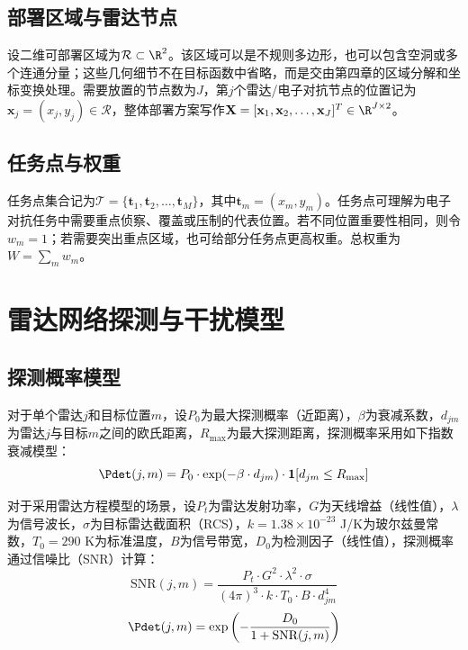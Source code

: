 \subsection{部署区域与雷达节点}

设二维可部署区域为$\mathcal{R} \subset \R^2$。该区域可以是不规则多边形，也可以包含空洞或多个连通分量；这些几何细节不在目标函数中省略，而是交由第四章的区域分解和坐标变换处理。需要放置的节点数为$J$，第$j$个雷达/电子对抗节点的位置记为$\mathbf{x}_j=(x_j,y_j)\in\mathcal{R}$，整体部署方案写作$\mathbf{X}=[\mathbf{x}_1,\mathbf{x}_2,\ldots,\mathbf{x}_J]^T\in\R^{J\times2}$。

\subsection{任务点与权重}

任务点集合记为$\mathcal{T}=\{\mathbf{t}_1,\mathbf{t}_2,\ldots,\mathbf{t}_M\}$，其中$\mathbf{t}_m=(x_m,y_m)$。任务点可理解为电子对抗任务中需要重点侦察、覆盖或压制的代表位置。若不同位置重要性相同，则令$w_m=1$；若需要突出重点区域，也可给部分任务点更高权重。总权重为$W=\sum_m w_m$。

\section{雷达网络探测与干扰模型}

\subsection{探测概率模型}

对于单个雷达$j$和目标位置$m$，设$P_0$为最大探测概率（近距离），$\beta$为衰减系数，$d_{jm}$为雷达$j$与目标$m$之间的欧氏距离，$R_{\max}$为最大探测距离，探测概率采用如下指数衰减模型：
\begin{equation}
\Pdet(j, m) = P_0 \cdot \exp(-\beta \cdot d_{jm}) \cdot \mathbf{1}[d_{jm} \leq R_{\max}]
\label{eq:detection_prob}
\end{equation}

对于采用雷达方程模型的场景，设$P_t$为雷达发射功率，$G$为天线增益（线性值），$\lambda$为信号波长，$\sigma$为目标雷达截面积（RCS），$k=1.38\times10^{-23}$ J/K为玻尔兹曼常数，$T_0=290$ K为标准温度，$B$为信号带宽，$D_0$为检测因子（线性值），探测概率通过信噪比（SNR）计算：
\vspace{-0.5\baselineskip}
\begin{equation}
\text{SNR}(j, m) = \frac{P_t \cdot G^2 \cdot \lambda^2 \cdot \sigma}{(4\pi)^3 \cdot k \cdot T_0 \cdot B \cdot d_{jm}^4}
\label{eq:snr}
\end{equation}
\begin{equation}
\Pdet(j, m) = \exp\left(-\frac{D_0}{1 + \text{SNR}(j, m)}\right)
\label{eq:detection_prob_radar}
\end{equation}

